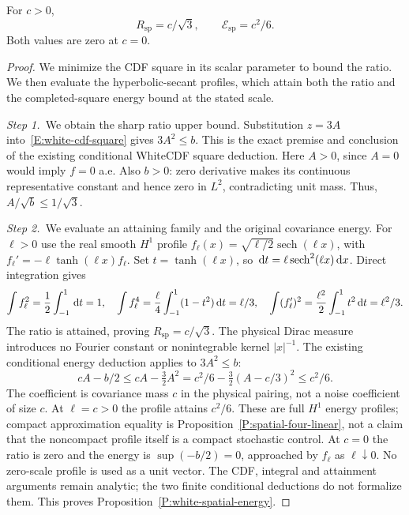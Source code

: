 \begin{proposition}\label{P:white-spatial-energy}
  For $c > 0$,
  \[
    R_{\mathrm{sp}}=c/\sqrt3,\qquad
    \mathcal{E}_{\mathrm{sp}}=c^2/6.
  \]
  Both values are zero at $c = 0$.
\end{proposition}

\begin{proof}
  We minimize the CDF square in its scalar parameter to bound the ratio. We
  then evaluate the hyperbolic-secant profiles, which attain both the ratio
  and the completed-square energy bound at the stated scale.


  \medskip
  \noindent\textit{Step 1.~}We obtain the sharp ratio upper bound.
  Substitution $z = 3A$ into~\eqref{E:white-cdf-square} gives $3A^2 \le b$. This
  is the exact premise and conclusion of the existing conditional WhiteCDF
  square deduction. Here $A > 0$, since $A = 0$ would imply $f = 0$ a.e. Also $b
  > 0$: zero derivative makes its continuous representative constant and hence
  zero in $L^2$, contradicting unit mass. Thus, $A/\sqrt b \le 1/\sqrt3$.


  \medskip
  \noindent\textit{Step 2.~}We evaluate an attaining family and the original
  covariance energy.
  For $\ell > 0$ use the real smooth $H^1$ profile $f_\ell(x) =
  \sqrt{\ell/2}\operatorname{sech}(\ell x)$, with $f_\ell' = -\ell\tanh(\ell
  x)f_\ell$. Set $t = \tanh(\ell x)$, so $\,\mathrm{d} t = \ell\operatorname{sech}^2(\ell
  x)\,\mathrm{d} x$. Direct integration gives
  \[
    \int f_\ell^2=\frac12\int_{-1}^1\,\mathrm{d} t=1,\quad
    \int f_\ell^4=\frac\ell4\int_{-1}^1(1-t^2)\,\mathrm{d} t=\ell/3,\quad
    \int(f_\ell')^2=\frac{\ell^2}2\int_{-1}^1t^2\,\mathrm{d} t=\ell^2/3.
  \]
  The ratio is attained, proving $R_{\mathrm{sp}} = c/\sqrt3$. The physical
  Dirac measure introduces no Fourier constant or nonintegrable kernel
  $|x|^{-1}$. The existing conditional energy deduction applies to $3A^2 \le b$:
  \[
    cA-b/2\le cA-\tfrac32A^2
    =c^2/6-\tfrac32(A-c/3)^2\le c^2/6 .
  \]
  The coefficient is covariance mass $c$ in the
  physical pairing, not a noise coefficient of size $c$.
  At $\ell = c > 0$ the profile attains $c^2/6$. These are full $H^1$ energy
  profiles; compact approximation equality is
  Proposition~\ref{P:spatial-four-linear}, not a claim that the noncompact
  profile itself is a compact stochastic control. At $c = 0$ the ratio is zero
  and the energy is $\sup(-b/2) = 0$, approached by $f_\ell$ as
  $\ell\downarrow0$. No zero-scale profile is used as a unit vector. The CDF,
  integral and attainment arguments remain analytic; the two finite conditional
  deductions do not formalize them. This proves
  Proposition~\ref{P:white-spatial-energy}.
\end{proof}

